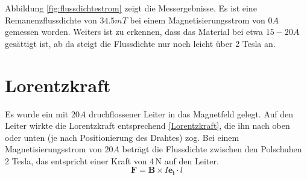 \documentclass[a4paper,twoside,12pt,DIV=13,BCOR=5mm,numbers=noenddot,cleardoublepage=empty]{scrbook}
\begin{document}
\noindent Abbildung \ref{fig:flussdichtestrom} zeigt die Messergebnisse. Es ist eine Remanenzflussdichte von $34.5 mT$ bei einem Magnetisierungsstrom von $0 A$ gemessen worden. Weiters ist zu erkennen, dass das Material bei etwa $15-20 A$ gesättigt ist, ab da steigt die Flussdichte nur noch leicht über 2 Tesla an.

\section{Lorentzkraft}
Es wurde ein mit $20 A$ druchflossener Leiter in das Magnetfeld gelegt. Auf den Leiter wirkte die Lorentzkraft entsprechend \autoref{Lorentzkraft}, die ihn nach oben oder unten (je nach Positionierung des Drahtes) zog. Bei einem Magnetisierungsstrom von $20 A$ beträgt die Flussdichte zwischen den Polschuhen 2 Tesla, das entspricht einer Kraft von 4\,N auf den Leiter.
\begin{equation}
	\mathbf{F} = \mathbf{B} \times I \mathbf{e_i} \cdot l
	\label{Lorentzkraft}
\end{equation}
\end{document}
